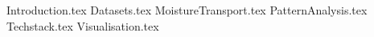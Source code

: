 \documentclass[aspectratio=169]{beamer}
\begin{document}
\maketitlepage %

{Introduction.tex}
{Datasets.tex}
{MoistureTransport.tex}
{PatternAnalysis.tex}
{Techstack.tex}
{Visualisation.tex}
\printbibliography
\end{document}
